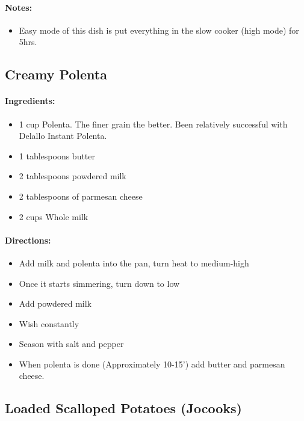 \documentclass{article}
\begin{document}
\paragraph{Notes:}
\begin{itemize}
    \item Easy mode of this dish is put everything in the slow cooker (high mode) for 5hrs.
\end{itemize}

\subsection{Creamy Polenta}

\paragraph{Ingredients:}
\begin{itemize}
    \item 1 cup Polenta. The finer grain the better. Been relatively successful with Delallo Instant Polenta.
    \item 1 tablespoons butter
    \item 2 tablespoons powdered milk
    \item 2 tablespoons of parmesan cheese
    \item 2 cups Whole milk
\end{itemize}

\paragraph{Directions:}
\begin{itemize}
    \item Add milk and polenta into the pan, turn heat to medium-high
    \item Once it starts simmering, turn down to low
    \item Add powdered milk
    \item Wish constantly
    \item Season with salt and pepper
    \item When polenta is done (Approximately 10-15’) add butter and parmesan cheese.
\end{itemize}

\subsection{Loaded Scalloped Potatoes (Jocooks)}
\end{document}
